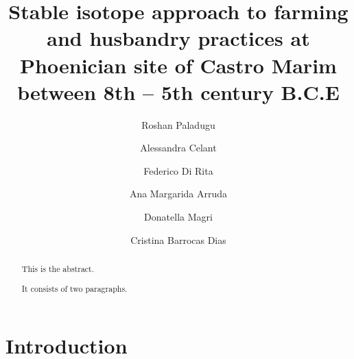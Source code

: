 \documentclass[3p]{elsarticle} %
\begin{document}
\begin{frontmatter}

  \title{Stable isotope approach to farming and husbandry practices at Phoenician site of Castro Marim between 8th -- 5th century B.C.E}
    \author[Universidade de Évora,Laboratório HERCULES]{Roshan Paladugu}
    \author[SAPIENZA Università di Roma]{Alessandra Celant}
    \author[SAPIENZA Università di Roma]{Federico Di Rita}
    \author[Universidade de Lisboa]{Ana Margarida Arruda}
    \author[SAPIENZA Università di Roma]{Donatella Magri}
    \author[Universidade de Évora,Laboratório HERCULES]{Cristina Barrocas Dias}
      \address[Universidade de Évora]{Departamento de Química, Escola de Ciências e Tecnologia, Universidade de Évora, Colégio Luís António Verney, Rua Romão Ramalho 59, Évora, Portugal (7000-671)}
    \address[Laboratório HERCULES]{Laboratório HERCULES, Universidade de Évora, Palácio do Vimioso, Largo Marquês de Marialva 8, 7000-554 Évora, Portugal}
    \address[SAPIENZA Università di Roma]{Dipartimento di Biologia Ambientale, SAPIENZA Università di Roma, Piazzale A. Moro 5, 00185 Roma, Italy}
    \address[Universidade de Lisboa]{Centro de Arqueologia da Universidade de Lisboa, Faculdade de Letras da Universidade de Lisboa, Alameda da Universidade, 1600-214, Lisboa, Portugal}
  
  \begin{abstract}
  This is the abstract.

  It consists of two paragraphs.
  \end{abstract}
  
 \end{frontmatter}

\hypertarget{introduction}{%
\section{Introduction}\label{introduction}}
\end{document}
